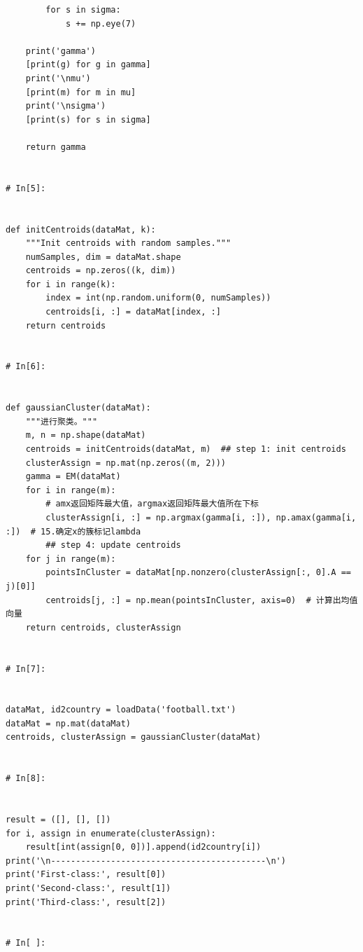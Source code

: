 \documentclass[a4paper, 11pt]{article}
\numberwithin{equation}{subsection}
\begin{document}
\begin{lstlisting}
        for s in sigma:
            s += np.eye(7)
            
    print('gamma')
    [print(g) for g in gamma]
    print('\nmu')
    [print(m) for m in mu]
    print('\nsigma')
    [print(s) for s in sigma]
    
    return gamma


# In[5]:


def initCentroids(dataMat, k):
    """Init centroids with random samples."""
    numSamples, dim = dataMat.shape
    centroids = np.zeros((k, dim))
    for i in range(k):
        index = int(np.random.uniform(0, numSamples))
        centroids[i, :] = dataMat[index, :]
    return centroids


# In[6]:


def gaussianCluster(dataMat):
    """进行聚类。"""
    m, n = np.shape(dataMat)
    centroids = initCentroids(dataMat, m)  ## step 1: init centroids
    clusterAssign = np.mat(np.zeros((m, 2)))
    gamma = EM(dataMat)
    for i in range(m):
        # amx返回矩阵最大值，argmax返回矩阵最大值所在下标
        clusterAssign[i, :] = np.argmax(gamma[i, :]), np.amax(gamma[i, :])  # 15.确定x的簇标记lambda
        ## step 4: update centroids
    for j in range(m):
        pointsInCluster = dataMat[np.nonzero(clusterAssign[:, 0].A == j)[0]]
        centroids[j, :] = np.mean(pointsInCluster, axis=0)  # 计算出均值向量
    return centroids, clusterAssign


# In[7]:


dataMat, id2country = loadData('football.txt')
dataMat = np.mat(dataMat)
centroids, clusterAssign = gaussianCluster(dataMat)


# In[8]:


result = ([], [], [])
for i, assign in enumerate(clusterAssign):
    result[int(assign[0, 0])].append(id2country[i])
print('\n-------------------------------------------\n')
print('First-class:', result[0])
print('Second-class:', result[1])
print('Third-class:', result[2])


# In[ ]:





\end{lstlisting}
\end{document}
